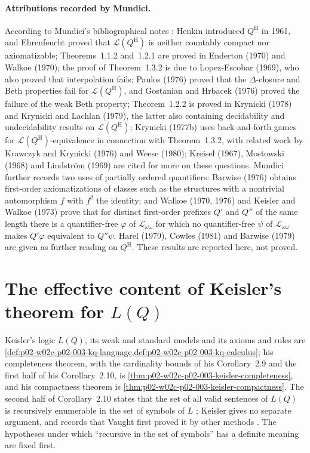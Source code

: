 \paragraph{Attributions recorded by Mundici.}  According to Mundici's
bibliographical notes \cite[p.~217]{Mundici1985OtherQuantifiers}:
Henkin introduced \(Q^{\mathrm H}\) in 1961, and Ehrenfeucht proved that
\(\mathscr L(Q^{\mathrm H})\) is neither countably compact nor
axiomatizable; Theorems~1.1.2 and~1.2.1 are proved in Enderton (1970) and
Walkoe (1970); the proof of Theorem~1.3.2 is due to Lopez-Escobar (1969),
who also proved that interpolation fails; Paulos (1976) proved that the
\(\Delta\)-closure and Beth properties fail for \(\mathscr L(Q^{\mathrm
H})\), and Gostanian and Hrbacek (1976) proved the failure of the weak
Beth property; Theorem~1.2.2 is proved in Krynicki (1978) and Krynicki and
Lachlan (1979), the latter also containing decidability and
undecidability results on \(\mathscr L(Q^{\mathrm H})\); Krynicki (1977b)
uses back-and-forth games for \(\mathscr L(Q^{\mathrm H})\)-equivalence
in connection with Theorem~1.3.2, with related work by Krawczyk and
Krynicki (1976) and Weese (1980); Kreisel (1967), Mostowski (1968) and
Lindstr\"om (1969) are cited for more on these questions.  Mundici further records two uses of
partially ordered quantifiers: Barwise (1976) obtains first-order
axiomatizations of classes such as the structures with a nontrivial
automorphism \(f\) with \(f^2\) the identity; and Walkoe (1970, 1976) and
Keisler and Walkoe (1973) prove that for distinct first-order prefixes
\(Q'\) and \(Q''\) of the same length there is a quantifier-free
\(\varphi\) of \(\mathscr L_{\omega\omega}\) for which no quantifier-free
\(\psi\) of \(\mathscr L_{\omega\omega}\) makes \(Q'\varphi\) equivalent to
\(Q''\psi\).  Harel (1979), Cowles (1981) and Barwise (1979) are given as
further reading on \(Q^{\mathrm H}\).  These results are reported here,
not proved.


\section{The effective content of Keisler's theorem for \(L(Q)\)}
\label{sec:p03-w03-p03-042-keisler-effective}

Keisler's logic \(L(Q)\), its weak and standard models and its axioms and
rules are \cref{def:p02-w02c-p02-003-kq-language,def:p02-w02c-p02-003-kq-calculus};
his completeness theorem, with the cardinality bounds of his
Corollary~2.9 and the first half of his Corollary~2.10, is
\cref{thm:p02-w02c-p02-003-keisler-completeness}, and his compactness
theorem is \cref{thm:p02-w02c-p02-003-keisler-compactness}.  The second
half of Corollary~2.10 states that the set of all valid sentences of
\(L(Q)\) is recursively enumerable in the set of symbols of \(L\)
\cite[\S2, p.~26]{Keisler1970}; Keisler gives no separate argument, and
records that Vaught first proved it by other methods
\cite[\S2, p.~27]{Keisler1970}.  The hypotheses under which ``recursive
in the set of symbols'' has a definite meaning are fixed first.

